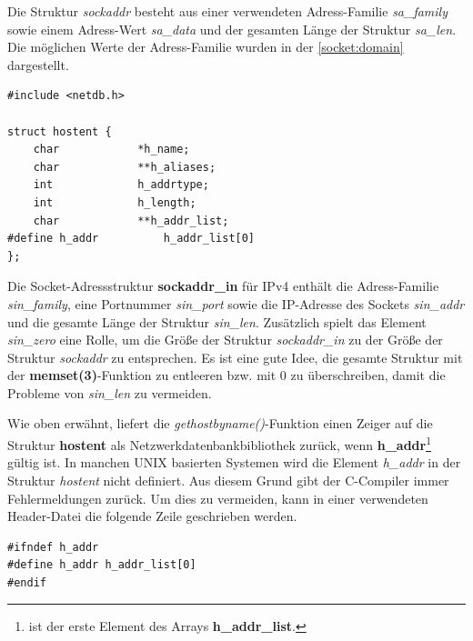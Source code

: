 Die Struktur \textit{sockaddr} besteht aus einer verwendeten Adress-Familie \textit{sa\_family} sowie einem Adress-Wert \textit{sa\_data} und der gesamten Länge der Struktur \textit{sa\_len}. Die möglichen Werte der Adress-Familie wurden in der \autoref{socket:domain} dargestellt. \smallskip \smallskip

\begin{verbatim}
#include <netdb.h>

struct hostent {
	char            *h_name;
	char            **h_aliases;
	int             h_addrtype;
	int             h_length;
	char            **h_addr_list;
#define h_addr          h_addr_list[0]
};
\end{verbatim}
\smallskip \smallskip

Die Socket-Adressstruktur \textbf{sockaddr\_in} für IPv4 enthält die Adress-Familie \textit{sin\_family}, eine Portnummer \textit{sin\_port} sowie die IP-Adresse des Sockets \textit{sin\_addr} und die gesamte Länge der Struktur \textit{sin\_len}. Zusätzlich spielt das Element \textit{sin\_zero} eine Rolle, um die Größe der Struktur \textit{sockaddr\_in} zu der Größe der Struktur \textit{sockaddr} zu entsprechen. Es ist eine gute Idee, die gesamte Struktur mit der \textbf{memset(3)}-Funktion zu entleeren bzw. mit $0$ zu überschreiben, damit die Probleme von \textit{sin\_len} zu vermeiden. \smallskip \smallskip

Wie oben erwähnt, liefert die \textit{gethostbyname()}-Funktion einen Zeiger auf die Struktur \textbf{hostent} als Netzwerkdatenbankbibliothek zurück, wenn \textbf{h\_addr}\footnote{ist der erste Element des Arrays \textbf{h\_addr\_list}.} gültig ist. In manchen UNIX basierten Systemen wird die Element \textit{h\_addr} in der Struktur \textit{hostent} nicht definiert. Aus diesem Grund gibt der C-Compiler immer Fehlermeldungen zurück. Um dies zu vermeiden, kann in einer verwendeten Header-Datei die folgende Zeile geschrieben werden. \smallskip \smallskip


\begin{verbatim}
#ifndef h_addr
#define h_addr h_addr_list[0]
#endif
\end{verbatim}




